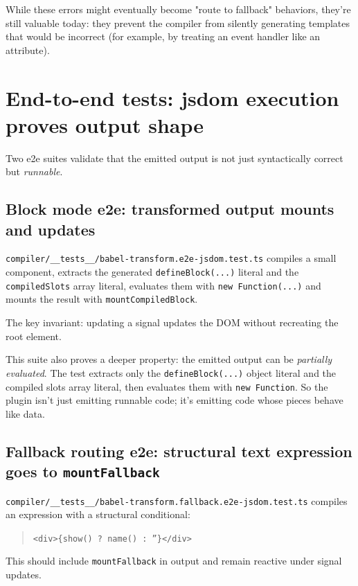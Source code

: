 While these errors might eventually become "route to fallback" behaviors, they're still valuable today: they prevent the compiler from silently generating templates that would be incorrect (for example, by treating an event handler like an attribute).

\section{End-to-end tests: jsdom execution proves output shape}

Two e2e suites validate that the emitted output is not just syntactically correct but \emph{runnable}.

\subsection{Block mode e2e: transformed output mounts and updates}

\texttt{compiler/\_\_tests\_\_/babel-transform.e2e-jsdom.test.ts} compiles a small component, extracts the generated \texttt{defineBlock(...)} literal and the \texttt{compiledSlots} array literal, evaluates them with \texttt{new Function(...)} and mounts the result with \texttt{mountCompiledBlock}.

The key invariant: updating a signal updates the DOM without recreating the root element.

This suite also proves a deeper property: the emitted output can be \emph{partially evaluated}.
The test extracts only the \texttt{defineBlock(...)} object literal and the compiled slots array literal, then evaluates them with \texttt{new Function}.
So the plugin isn't just emitting runnable code; it's emitting code whose pieces behave like data.

\subsection{Fallback routing e2e: structural text expression goes to \texttt{mountFallback}}

\texttt{compiler/\_\_tests\_\_/babel-transform.fallback.e2e-jsdom.test.ts} compiles an expression with a structural conditional:

\begin{quote}
\texttt{<div>\{show() ? name() : ''\}</div>}
\end{quote}

This should include \texttt{mountFallback} in output and remain reactive under signal updates.

